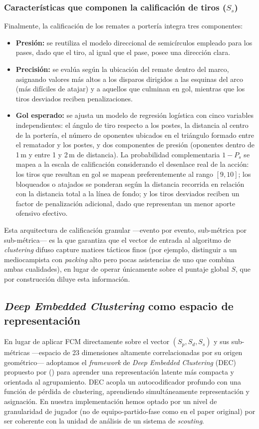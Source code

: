 \documentclass[conference]{IEEEtran}
\begin{document}
\subsubsection{Características que componen la calificación de tiros ($S_s$)}
Finalmente, la calificación de los remates a portería integra tres componentes:
\begin{itemize}
    \item \textbf{Presión:} se reutiliza el modelo direccional de semicírculos empleado para los pases, dado que el tiro, al igual que el pase, posee una dirección clara.
    \item \textbf{Precisión:} se evalúa según la ubicación del remate dentro del marco, asignando valores más altos a los disparos dirigidos a las esquinas del arco (más difíciles de atajar) y a aquellos que culminan en gol, mientras que los tiros desviados reciben penalizaciones.
    \item \textbf{Gol esperado:} se ajusta un modelo de regresión logística con cinco variables independientes: el ángulo de tiro respecto a los postes, la distancia al centro de la portería, el número de oponentes ubicados en el triángulo formado entre el rematador y los postes, y dos componentes de presión (oponentes dentro de 1\,m y entre 1 y 2\,m de distancia). La probabilidad complementaria $1-P_s$ se mapea a la escala de calificación considerando el desenlace real de la acción: los tiros que resultan en gol se mapean preferentemente al rango $[9,10]$; los bloqueados o atajados se ponderan según la distancia recorrida en relación con la distancia total a la línea de fondo; y los tiros desviados reciben un factor de penalización adicional, dado que representan un menor aporte ofensivo efectivo.
\end{itemize}

Esta arquitectura de calificación granular —evento por evento, sub-métrica por sub-métrica— es la que garantiza que el vector de entrada al algoritmo de \textit{clustering} difuso capture matices tácticos finos (por ejemplo, distinguir a un mediocampista con \textit{packing} alto pero pocas asistencias de uno que combina ambas cualidades), en lugar de operar únicamente sobre el puntaje global $S$, que por construcción diluye esta información.

\subsection{\textit{Deep Embedded Clustering} como espacio de representación}
\label{subsec:dec}
En lugar de aplicar FCM directamente sobre el vector $(S_p, S_d, S_s)$ y sus sub-métricas —espacio de 23 dimensiones altamente correlacionadas por su origen geométrico— adoptamos el \textit{framework} de \textit{Deep Embedded Clustering} (DEC) propuesto por \citeauthor{demir2026how} (\citeyear{demir2026how}) para aprender una representación latente más compacta y orientada al agrupamiento. DEC acopla un autocodificador profundo con una función de pérdida de clustering, aprendiendo simultáneamente representación y asignación. En nuestra implementación hemos optado por un nivel de granularidad de jugador (no de equipo-partido-fase como en el paper original) por ser coherente con la unidad de análisis de un sistema de \textit{scouting}.
\end{document}
